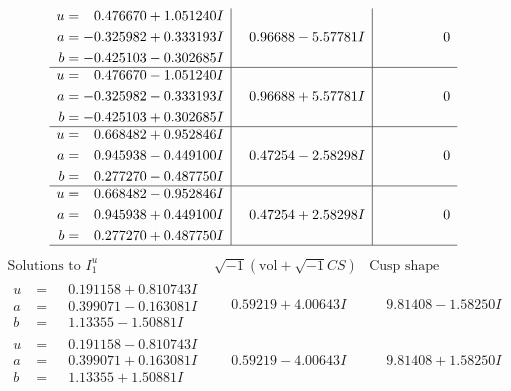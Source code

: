 \documentclass[1p]{elsarticle_modified}
\theoremstyle{definition}
\newcommand{\I}{\sqrt{-1}}
\begin{document}
$$\begin{array}{c|c|c}
\begin{aligned}
u &= \phantom{-}0.476670 + 1.051240 I \\
a &= -0.325982 + 0.333193 I \\
b &= -0.425103 - 0.302685 I\end{aligned}
 & \phantom{-}0.96688 - 5.57781 I & \phantom{-0.000000 } 0 \\ \hline\begin{aligned}
u &= \phantom{-}0.476670 - 1.051240 I \\
a &= -0.325982 - 0.333193 I \\
b &= -0.425103 + 0.302685 I\end{aligned}
 & \phantom{-}0.96688 + 5.57781 I & \phantom{-0.000000 } 0 \\ \hline\begin{aligned}
u &= \phantom{-}0.668482 + 0.952846 I \\
a &= \phantom{-}0.945938 - 0.449100 I \\
b &= \phantom{-}0.277270 - 0.487750 I\end{aligned}
 & \phantom{-}0.47254 - 2.58298 I & \phantom{-0.000000 } 0 \\ \hline\begin{aligned}
u &= \phantom{-}0.668482 - 0.952846 I \\
a &= \phantom{-}0.945938 + 0.449100 I \\
b &= \phantom{-}0.277270 + 0.487750 I\end{aligned}
 & \phantom{-}0.47254 + 2.58298 I & \phantom{-0.000000 } 0\\
 \hline 
 \end{array}$$\newpage$$\begin{array}{c|c|c}  
\text{Solutions to }I^u_{1}& \I (\text{vol} + \sqrt{-1}CS) & \text{Cusp shape}\\
 \hline 
\begin{aligned}
u &= \phantom{-}0.191158 + 0.810743 I \\
a &= \phantom{-}0.399071 - 0.163081 I \\
b &= \phantom{-}1.13355 - 1.50881 I\end{aligned}
 & \phantom{-}0.59219 + 4.00643 I & \phantom{-}9.81408 - 1.58250 I \\ \hline\begin{aligned}
u &= \phantom{-}0.191158 - 0.810743 I \\
a &= \phantom{-}0.399071 + 0.163081 I \\
b &= \phantom{-}1.13355 + 1.50881 I\end{aligned}
 & \phantom{-}0.59219 - 4.00643 I & \phantom{-}9.81408 + 1.58250 I \\ \hline\begin{aligned}

\end{aligned}
\end{array}$$
\end{document}
